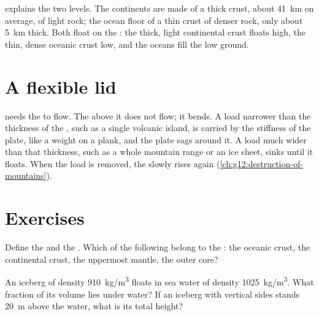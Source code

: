  explains the two levels. The continents are made of a thick crust,
about \qty{41}{km} on average, of light rock; the ocean floor of a thin crust
of denser rock, only about \qty{5}{km} thick. Both float on the
: the thick, light continental crust floats high, the thin, dense
oceanic crust low, and the oceans fill the low ground.

\section{A flexible lid}

 needs the  to flow. The  above it does not
flow; it bends. A load narrower than the thickness of the , such
as a single volcanic island, is carried by the stiffness of the plate, like a
weight on a plank, and the plate sags around it. A load much wider than that
thickness, such as a whole mountain range or an ice sheet, sinks until it
floats. When the load is removed, the  slowly rises again
(\cref{ch:g12:destruction-of-mountains}).

\section{Exercises}

\begin{exercise}[$\star$]\label{exo:g11:lithosphere-asthenosphere:1}
Define the  and the . Which of the following belong
to the : the oceanic crust, the continental crust, the uppermost
mantle, the outer core?
\end{exercise}

\begin{exercise}[$\star$]\label{exo:g11:lithosphere-asthenosphere:2}
An iceberg of density \qty{910}{kg/m^3} floats in sea water of density
\qty{1025}{kg/m^3}. What fraction of its volume lies under water? If an
iceberg with vertical sides stands \qty{20}{m} above the water, what is its
total height?
\end{exercise}

